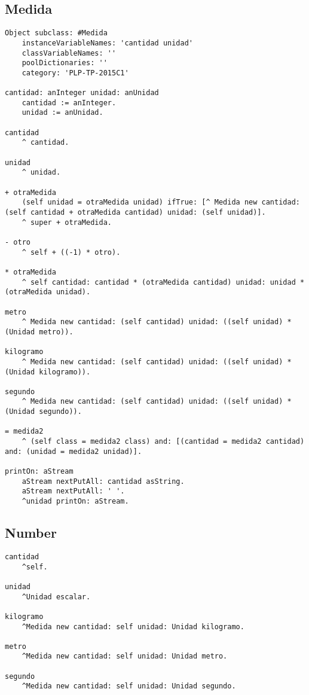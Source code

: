 \subsection{Medida}
\begin{lstlisting}
Object subclass: #Medida
	instanceVariableNames: 'cantidad unidad'
	classVariableNames: ''
	poolDictionaries: ''
	category: 'PLP-TP-2015C1'

cantidad: anInteger unidad: anUnidad
	cantidad := anInteger.
	unidad := anUnidad.

cantidad
	^ cantidad.

unidad
	^ unidad.

+ otraMedida
	(self unidad = otraMedida unidad) ifTrue: [^ Medida new cantidad: (self cantidad + otraMedida cantidad) unidad: (self unidad)].
	^ super + otraMedida.

- otro 
	^ self + ((-1) * otro).

* otraMedida 
	^ self cantidad: cantidad * (otraMedida cantidad) unidad: unidad * (otraMedida unidad).

metro
	^ Medida new cantidad: (self cantidad) unidad: ((self unidad) * (Unidad metro)).

kilogramo
	^ Medida new cantidad: (self cantidad) unidad: ((self unidad) * (Unidad kilogramo)).

segundo
	^ Medida new cantidad: (self cantidad) unidad: ((self unidad) * (Unidad segundo)).

= medida2
	^ (self class = medida2 class) and: [(cantidad = medida2 cantidad) and: (unidad = medida2 unidad)].

printOn: aStream
	aStream nextPutAll: cantidad asString. 
	aStream nextPutAll: ' '. 
	^unidad printOn: aStream.

\end{lstlisting}
\vspace{5mm}

\subsection{Number}
\begin{lstlisting}
cantidad
	^self.

unidad
	^Unidad escalar.

kilogramo
	^Medida new cantidad: self unidad: Unidad kilogramo.

metro
	^Medida new cantidad: self unidad: Unidad metro.
	
segundo
	^Medida new cantidad: self unidad: Unidad segundo.

\end{lstlisting}